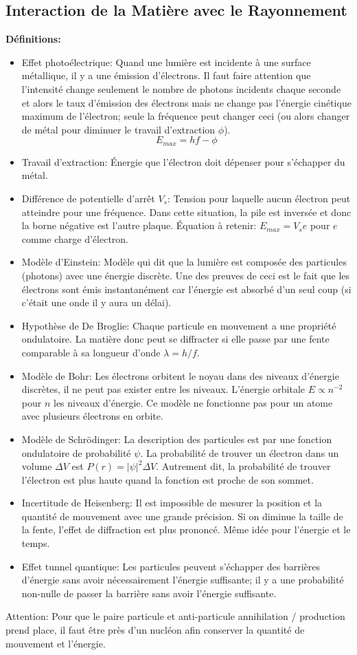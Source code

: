 \documentclass[french, a4paper, 12pt]{article}
\begin{document}
\subsection{Interaction de la Matière avec le Rayonnement}
\textbf{Définitions:}
\begin{itemize}
\item Effet photoélectrique: Quand une lumière est incidente à une surface métallique, il y a une émission d'électrons. Il faut faire attention que l'intensité change seulement le nombre de photons incidents chaque seconde et alors le taux d'émission des électrons mais ne change pas l'énergie cinétique maximum de l'électron; seule la fréquence peut changer ceci (ou alors changer de métal pour diminuer le travail d'extraction $\phi$).
\[
E_{max}=hf - \phi
\]
\item Travail d'extraction: Énergie que l'électron doit dépenser pour s'échapper du métal.
\item Différence de potentielle d'arrêt $V_s$: Tension pour laquelle aucun électron peut atteindre pour une fréquence. Dans cette situation, la pile est inversée et donc la borne négative est l'autre plaque. Équation à retenir: $E_{max}=V_s e$ pour $e$ comme charge d'électron.
\item Modèle d'Einstein: Modèle qui dit que la lumière est composée des particules (photons) avec une énergie discrète. Une des preuves de ceci est le fait que les électrons sont émis instantanément car l'énergie est absorbé d'un seul coup (si c'était une onde il y aura un délai).
\item Hypothèse de De Broglie: Chaque particule en mouvement a une propriété ondulatoire. La matière donc peut se diffracter si elle passe par une fente comparable à sa longueur d'onde $\lambda = h/f$.
\item Modèle de Bohr: Les électrons orbitent le noyau dans des niveaux d'énergie discrètes, il ne peut pas exister entre les niveaux. L'énergie orbitale $E \propto n^{-2}$ pour $n$ les niveaux d'énergie. Ce modèle ne fonctionne pas pour un atome avec plusieurs électrons en orbite.
\item Modèle de Schrödinger: La description des particules est par une fonction ondulatoire de probabilité $\psi$. La probabilité de trouver un électron dans un volume $\Delta V$ est $P(r)=|\psi|^2 \Delta V$. Autrement dit, la probabilité de trouver l'électron est plus haute quand la fonction est proche de son sommet.
\item Incertitude de Heisenberg: Il est impossible de mesurer la position et la quantité de mouvement avec une grande précision. Si on diminue la taille de la fente, l'effet de diffraction est plus prononcé. Même idée pour l'énergie et le temps.
\item Effet tunnel quantique: Les particules peuvent s'échapper des barrières d'énergie sans avoir nécessairement l'énergie suffisante; il y a une probabilité non-nulle de passer la barrière sans avoir l'énergie suffisante.
\end{itemize}
Attention: Pour que le paire particule et anti-particule annihilation / production prend place, il faut être près d'un nucléon afin conserver la quantité de mouvement et l'énergie.
\end{document}
